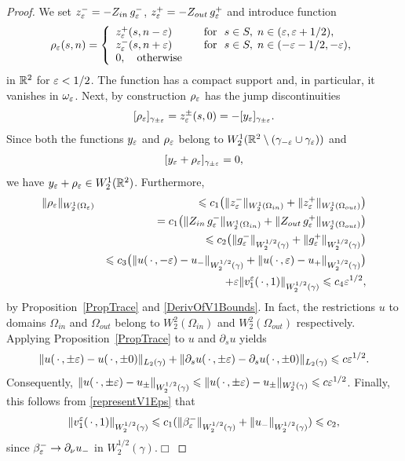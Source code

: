 \begin{proof}
We set $z_\varepsilon^-=-Z_{in}\, g_\varepsilon^-$, $z_\varepsilon^+=-Z_{out}\, g_\varepsilon^+$ and introduce  function
\begin{equation}\label{RhoEps}
\rho_\varepsilon(s, n)=
\left\{
  \begin{array}{ll}
    z_\varepsilon^+(s,n-\varepsilon)&\quad \hbox{for \ }
                  s\in S, \; n\in (\varepsilon, \varepsilon+1/2 ), \\
    z_\varepsilon^-(s,n+\varepsilon)&\quad \hbox{for \ }
               s\in S, \; n\in (-\varepsilon-1/2,-\varepsilon), \\
   0,\quad \hbox{otherwise}
  \end{array}
\right.
\end{equation}
in  $\mathbb R^2$ for $\varepsilon<1/2$.
The function has a compact support and,  in particular, it vanishes in $\omega_\varepsilon$.
Next, by construction $\rho_\varepsilon$ has the jump discontinuities
$$
  [\rho_\varepsilon]_{\gamma_{\pm\varepsilon}}=z_\varepsilon^\pm(s,0)=-[y_\varepsilon]_{\gamma_{\pm\varepsilon}}.
$$
Since both the functions $y_\varepsilon$ and $\rho_\varepsilon$ belong to $W_2^1(\mathbb R^2\setminus(\gamma_{-\varepsilon}\cup \gamma_\varepsilon))$
and
$$
 [y_\varepsilon+\rho_\varepsilon]_{\gamma_{\pm\varepsilon}}=0,
$$
we have $y_\varepsilon+\rho_\varepsilon\in W_2^1(\mathbb R^2)$. Furthermore,
\begin{eqnarray}\nonumber
\|\rho_\varepsilon\|_{W_2^1(\Omega_\varepsilon)}&&\leqslant c_1\big( \|z_\varepsilon^-\|_{W_2^1(\Omega_{in})} +\|z_\varepsilon^+\|_{W_2^1(\Omega_{out})}\big)\\\nonumber
&&=c_1\big(\|Z_{in}\,  g_\varepsilon^-\|_{W_2^1(\Omega_{in})} +
\|Z_{out}\, g_\varepsilon^+\|_{W_2^1(\Omega_{out})}\big)\\\nonumber
&&\leqslant c_2\big(\|g_\varepsilon^-\|_{W_2^{1/2}(\gamma)}
+\|g_\varepsilon^+\|_{W_2^{1/2}(\gamma)}\big)\\\nonumber
&&\leqslant c_3\big(\|u(\,\cdot\,,-\varepsilon)-u_-\|_{W_2^{1/2}(\gamma)}
+\|u(\,\cdot\,,\varepsilon)-u_+\|_{W_2^{1/2}(\gamma)}\big)\\\nonumber
&&
+\varepsilon \|v_1^\varepsilon(\,\cdot\,,1)\|_{W_2^{1/2}(\gamma)}\leqslant c_4\varepsilon^{1/2},
\end{eqnarray}
by Proposition~\ref{PropTrace} and \eqref{DerivOfV1Bounds}. In fact, the restrictions $u$ to domains $\Omega_{in}$ and $\Omega_{out}$ belong to $W_2^2(\Omega_{in})$ and $W_2^2(\Omega_{out})$ respectively. Applying Proposition~\ref{PropTrace} to $u$ and $\partial_su$ yields
$$
   \|u(\,\cdot\,,\pm\varepsilon)-u(\,\cdot\,,\pm0)\|_{L_2(\gamma)}+
   \|\partial_s u(\,\cdot\,,\pm\varepsilon)-\partial_s u(\,\cdot\,,\pm0)\|_{L_2(\gamma)}\leqslant c\varepsilon^{1/2}.
$$
Consequently,
$
  \|u(\,\cdot\,,\pm\varepsilon)-u_\pm\|_{W_2^{1/2}(\gamma)}\leqslant \|u(\,\cdot\,,\pm\varepsilon)-u_\pm\|_{W_2^{1}(\gamma)}\leqslant c\varepsilon^{1/2}
$.
Finally, this follows from \eqref{representV1Eps} that
$$
 \|v_1^\varepsilon(\,\cdot\,,1)\|_{W_2^{1/2}(\gamma)}\leqslant c_1(\|\beta_\varepsilon^-\|_{W_2^{1/2}(\gamma)}+\|u_-\|_{W_2^{1/2}(\gamma)})\leqslant c_2,
$$
since $\beta_\varepsilon^-\to  \partial_\nu u_-$ in $W_2^{1/2}(\gamma)$.\hfill$\Box$
\end{proof}


